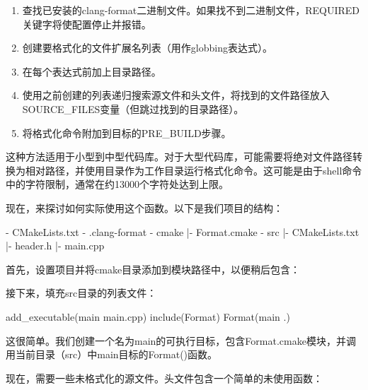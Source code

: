 \begin{enumerate}
\item
查找已安装的clang-format二进制文件。如果找不到二进制文件，REQUIRED关键字将使配置停止并报错。

\item
创建要格式化的文件扩展名列表（用作globbing表达式）。

\item
在每个表达式前加上目录路径。

\item
使用之前创建的列表递归搜索源文件和头文件，将找到的文件路径放入SOURCE\_FILES变量（但跳过找到的目录路径）。

\item
将格式化命令附加到目标的PRE\_BUILD步骤。
\end{enumerate}

这种方法适用于小型到中型代码库。对于大型代码库，可能需要将绝对文件路径转换为相对路径，并使用目录作为工作目录运行格式化命令。这可能是由于shell命令中的字符限制，通常在约13000个字符处达到上限。

现在，来探讨如何实际使用这个函数。以下是我们项目的结构：

\begin{shell}
- CMakeLists.txt
- .clang-format
- cmake
  |- Format.cmake
- src
  |- CMakeLists.txt
  |- header.h
  |- main.cpp
\end{shell}

首先，设置项目并将cmake目录添加到模块路径中，以便稍后包含：



接下来，填充src目录的列表文件：


\begin{cmake}
add_executable(main main.cpp)
include(Format)
Format(main .)
\end{cmake}

这很简单。我们创建一个名为main的可执行目标，包含Format.cmake模块，并调用当前目录（src）中main目标的Format()函数。

现在，需要一些未格式化的源文件。头文件包含一个简单的未使用函数：


